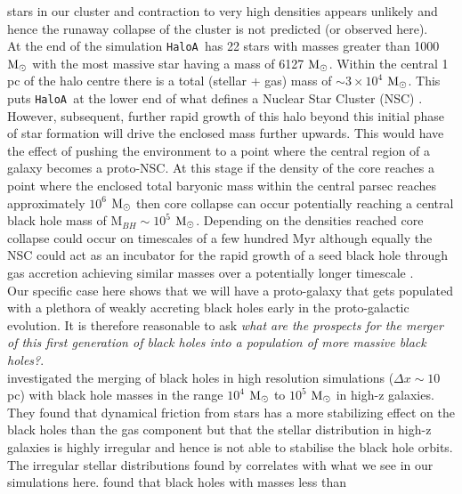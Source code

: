 \documentclass[twocolumn,iop,revtex4]{openjournal}
\newcommand{\msolar} {$\rm{M_{\odot}}~$}
\newcommand{\msolarc} {$\rm{M_{\odot}}$}
\newcommand{\ha} {\texttt{HaloA~}}
\begin{document}
stars in our cluster and contraction to very high densities appears unlikely and hence the
runaway collapse of the cluster is not predicted (or observed here). \\
\indent
At the end of the simulation \ha has 22 stars with masses greater than 1000 \msolar with
the most massive star having a mass of 6127 \msolarc. Within the central 1 pc of the 
  halo centre there is a total (stellar + gas) mass of $\sim 3 \times 10^4$ \msolarc.
  This puts \ha at the lower end of what defines a Nuclear Star Cluster (NSC) \citep[e.g.][]{Georgiev_2016}.
  However, subsequent, further rapid growth of this halo beyond this initial phase of star formation
  will drive the enclosed mass further upwards. This would have the effect of pushing the environment
  to a point where the central region of a galaxy becomes a proto-NSC. At this stage if the density
  of the core reaches a point where the enclosed total baryonic mass within the central parsec
  reaches approximately $10^6$ \msolar then core collapse can occur \citep{Davies_2011}
  potentially reaching a central black hole mass of M$_{BH} \sim 10^5$ \msolarc. Depending on the
  densities reached core collapse could occur on timescales of a few hundred Myr
  \citep{Davies_2011} although equally the NSC 
  could act as an incubator for the rapid growth of a seed black hole
  through gas accretion achieving
similar masses over a potentially longer timescale \citep{Natarajan_2020}. \\
\indent Our specific case here shows that we will have a  proto-galaxy that gets populated with a plethora of
weakly accreting black holes early in the proto-galactic evolution.
It is therefore reasonable to ask \textit{what are the prospects for the merger of this first generation
  of black holes into a population of more massive black holes?}. \\
\indent \cite{Pfister_2019} investigated the merging of black holes in high resolution
simulations ($\Delta x \sim 10$ pc) with black hole masses in the range
$10^4$ \msolar to $10^5$ \msolar in high-z galaxies. They found that dynamical friction from stars
has a more stabilizing effect on the black holes than the gas component but that the stellar
distribution in high-z galaxies is highly irregular and hence is not able to stabilise the black
hole orbits.
The irregular stellar distributions found by \cite{Pfister_2019} correlates with what
we see in our simulations here. \cite{Pfister_2019} found that black holes with masses less than
\end{document}
